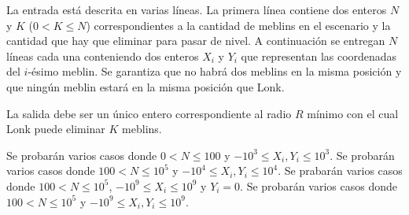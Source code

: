 \documentclass{oci}
\begin{document}
\begin{inputDescription}
  La entrada está descrita en varias líneas.
  La primera línea contiene dos enteros $N$ y $K$ ($0<K\leq N$) correspondientes a la cantidad
  de meblins en el escenario y la cantidad que hay que eliminar para pasar de nivel.
  A continuación se entregan $N$ líneas cada una conteniendo dos enteros $X_i$ y
  $Y_i$ que representan las coordenadas del $i$-ésimo meblin.
  Se garantiza que no habrá dos meblins en la misma posición y que ningún
  meblin estará en la misma posición que Lonk.
\end{inputDescription}

\begin{outputDescription}
  La salida debe ser un único entero correspondiente al radio $R$
  mínimo con el cual Lonk puede eliminar $K$ meblins.
\end{outputDescription}

\begin{scoreDescription}
 Se probarán varios casos donde $0 < N \leq 100$ y $-10^3 \leq X_i,Y_i  \leq 10^3$.
 Se probarán varios casos donde $100 < N \leq 10^5$ y $-10^4 \leq X_i, Y_i \leq 10^4$.
 Se prabarán varios casos donde $100 < N \leq 10^5$, $-10^9 \leq X_i \leq 10^9$ y $Y_i = 0$.
 Se probarán varios casos donde $100 < N \leq 10^5$ y $-10^9 \leq X_i, Y_i \leq 10^9$.
\end{scoreDescription}

\begin{sampleDescription}
\end{sampleDescription}
\end{document}
